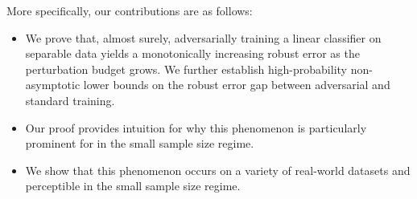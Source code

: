 More specifically, our contributions are as follows:
\begin{itemize}
\item We prove that, almost surely, adversarially training a linear classifier on separable data yields a monotonically increasing robust error as the perturbation budget grows. 
We further establish high-probability non-asymptotic lower bounds on the robust error gap between adversarial and standard training.
\item Our proof provides intuition for why this phenomenon is particularly prominent for \nameofattacks in the small sample size regime. %
\item We show that this phenomenon occurs on a variety of real-world datasets and perceptible \nameofattacks in the small sample size regime.
\end{itemize}



